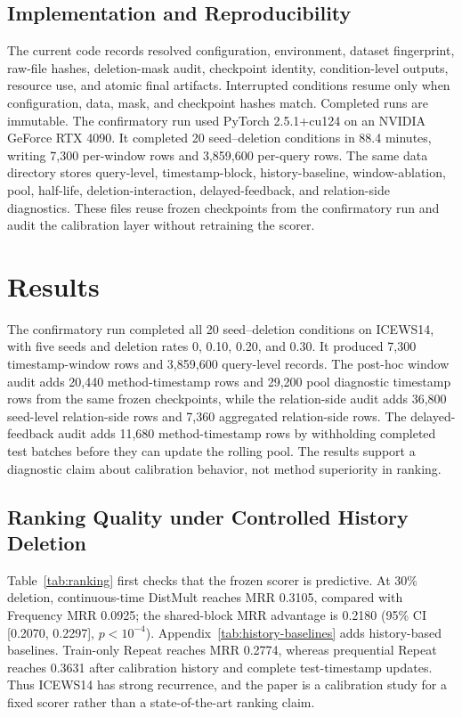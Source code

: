 \documentclass[10pt,twocolumn]{article}
\begin{document}
\subsection{Implementation and Reproducibility}

The current code records resolved configuration, environment, dataset
fingerprint, raw-file hashes, deletion-mask audit, checkpoint identity,
condition-level outputs, resource use, and atomic final artifacts. Interrupted
conditions resume only when configuration, data, mask, and checkpoint hashes
match. Completed runs are immutable.
The confirmatory run used PyTorch 2.5.1+cu124 on an NVIDIA GeForce RTX 4090.
It completed 20 seed--deletion conditions in 88.4 minutes, writing 7,300
per-window rows and 3,859,600 per-query rows.
The same data directory stores query-level, timestamp-block, history-baseline,
window-ablation, pool, half-life, deletion-interaction, delayed-feedback, and
relation-side diagnostics. These files reuse frozen checkpoints from the
confirmatory run and audit the calibration layer without retraining the
scorer.

\section{Results}
\label{sec:results}

The confirmatory run completed all 20 seed--deletion conditions on ICEWS14,
with five seeds and deletion rates 0, 0.10, 0.20, and 0.30. It produced 7,300
timestamp-window rows and 3,859,600 query-level records. The post-hoc
window audit adds 20,440 method-timestamp rows and 29,200 pool
diagnostic timestamp rows from the same frozen checkpoints, while the
relation-side audit adds 36,800 seed-level relation-side rows and 7,360
aggregated relation-side rows. The delayed-feedback audit adds 11,680
method-timestamp rows by withholding completed test batches before they can
update the rolling pool. The results support a diagnostic claim about
calibration behavior, not method superiority in ranking.

\subsection{Ranking Quality under Controlled History Deletion}

Table~\ref{tab:ranking} first checks that the frozen scorer is predictive. At
30\% deletion, continuous-time DistMult reaches MRR 0.3105, compared with
Frequency MRR 0.0925; the shared-block MRR advantage is 0.2180
(95\% CI [0.2070, 0.2297], \(p<10^{-4}\)). Appendix~\ref{tab:history-baselines}
adds history-based baselines. Train-only Repeat reaches MRR 0.2774, whereas
prequential Repeat reaches 0.3631 after calibration history and complete
test-timestamp updates. Thus ICEWS14 has strong recurrence, and the paper is a
calibration study for a fixed scorer rather than a state-of-the-art ranking
claim.
\end{document}

